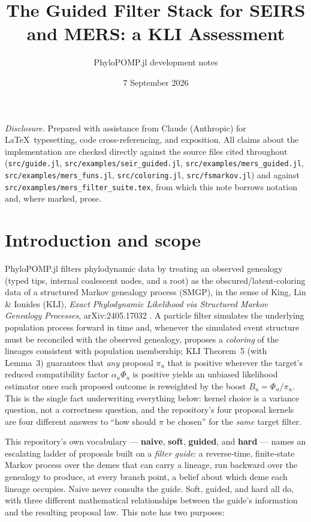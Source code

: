 \documentclass[11pt]{article}
\title{The Guided Filter Stack for SEIRS and MERS: a KLI Assessment}
\author{PhyloPOMP.jl development notes}
\date{7 September 2026}
\theoremstyle{plain}
\begin{document}
\maketitle

\medskip
\noindent\textit{Disclosure.} Prepared with assistance from Claude (Anthropic) for \LaTeX\
typesetting, code cross-referencing, and exposition. All claims about the implementation are
checked directly against the source files cited throughout (\texttt{src/guide.jl},
\texttt{src/examples/seir\_guided.jl}, \texttt{src/examples/mers\_guided.jl},
\texttt{src/examples/mers\_funs.jl}, \texttt{src/coloring.jl}, \texttt{src/fsmarkov.jl}) and
against \texttt{src/examples/mers\_filter\_suite.tex}, from which this note borrows notation and,
where marked, prose.
\bigskip

\tableofcontents
\bigskip

\section{Introduction and scope}
\label{sec:intro}

PhyloPOMP.jl filters phylodynamic data by treating an observed genealogy (typed tips, internal
coalescent nodes, and a root) as the obscured/latent-coloring data of a structured Markov
genealogy process (SMGP), in the sense of King, Lin \& Ionides (KLI), \emph{Exact Phylodynamic
Likelihood via Structured Markov Genealogy Processes}, arXiv:2405.17032 \cite{KLI}. A particle
filter simulates the underlying population process forward in time and, whenever the simulated
event structure must be reconciled with the observed genealogy, proposes a \emph{coloring} of the
lineages consistent with population membership; KLI Theorem~5 (with Lemma~3) guarantees that
\emph{any} proposal $\pi_u$ that is positive wherever the target's reduced compatibility factor
$\alpha_u\Phi_u$ is positive yields an unbiased likelihood estimator once each proposed outcome is
reweighted by the boost $B_u=\Phi_u/\pi_u$. This is the single fact underwriting everything below:
kernel choice is a variance question, not a correctness question, and the repository's four
proposal kernels are four different answers to ``how should $\pi$ be chosen'' for the \emph{same}
target filter.

This repository's own vocabulary --- \textbf{naive}, \textbf{soft}, \textbf{guided}, and
\textbf{hard} --- names an escalating ladder of proposals built on a \emph{filter guide}: a
reverse-time, finite-state Markov process over the demes that can carry a lineage, run backward
over the genealogy to produce, at every branch point, a belief about which deme each lineage
occupies. Naive never consults the guide. Soft, guided, and hard all do, with three different
mathematical relationships between the guide's information and the resulting proposal law. This
note has two purposes:
\end{document}
